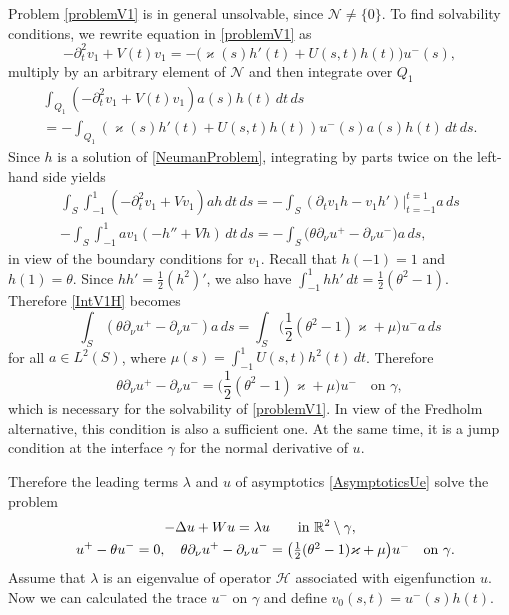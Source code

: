 \documentclass[reqno]{amsart}
\theoremstyle{plain}
\numberwithin{equation}{section}
\renewcommand{\kappa}{\varkappa}
\newcommand{\Real}{\mathbb R}
\newcommand{\cH}{\mathcal{H}}
\newcommand{\pte}{\partial_t}
\begin{document}
Problem \eqref{problemV1} is in general unsolvable, since $\mathcal{N}\neq\{0\}$.  To find solvabi\-li\-ty conditions, we rewrite  equation in \eqref{problemV1} as
\begin{equation}\label{eqnV1Expand}
  -\pte^2 v_1+V(t)v_1=-\big(\kappa(s)h'(t)+U(s,t)h(t)\big)u^-(s),
\end{equation}
multiply  by an arbitrary element of  $\mathcal{N}$  and then integrate over $Q_1$
\begin{multline}\label{IntV1H}
\int_{Q_1}\left(-\pte^2 v_1+V(t)v_1\right)a(s)h(t)\,dt\,ds
\\
=
-\int_{Q_1}(\kappa(s)h'(t)+U(s,t)h(t))u^-(s)a(s)h(t)\, dt\,ds.
\end{multline}
Since $h$ is a solution of \eqref{NeumanProblem}, integrating by parts twice on the left-hand side yields
\begin{multline*}
\int_{S} \int_{-1}^1\left(-\pte^2 v_1+Vv_1\right)a h\,dt \,ds
=-\int_{S}( \partial_tv_1 h-v_1 h')\big|_{t=-1}^{t=1}a\,ds\\-
\int_{S} \int_{-1}^1 a v_1\left(-h''+Vh\right)\,dt\,ds
=-\int_{S}\big(\theta\partial_\nu u^+-\partial_\nu u^-\big) a\,ds,
\end{multline*}
in view of the boundary conditions for $v_1$.
Recall that $h(-1)=1$ and $h(1)=\theta$.
Since $hh'=\frac12 (h^2)'$, we also have $\int_{-1}^1hh'\,d t=\textstyle\frac{1}{2 }(\theta^2-1)$.
Therefore \eqref{IntV1H} becomes
\begin{equation*}
\int_{S}\left(\theta\partial_\nu u^+-\partial_\nu u^-\right)a\,ds
=\int_{S}\big(\textstyle\frac{1}{2}(\theta^2-1)\kappa+\mu \big)u^-a\,ds
\end{equation*}
for all  $a\in L^2(S)$, where $\mu(s)=\int_{-1}^1 U(s,t)h^2(t)\, dt$.
Therefore
\begin{equation*}
  \theta\partial_\nu u^+-\partial_\nu u^-
=\big(\textstyle\frac{1}{2}(\theta^2-1)\kappa+\mu \big) u^-\quad\text {on }\gamma,
\end{equation*}
which is necessary for the solvability of \eqref{problemV1}.
In view of the Fredholm alternative, this condition is also a sufficient one. At the same time, it is a jump condition at the interface $\gamma$ for the normal derivative of $u$.

Therefore the leading terms $\lambda$ and $u$ of asymptotics \eqref{AsymptoticsUe} solve the problem
\begin{gather}\label{LimitProblemEq}
-\Delta u+Wu=\lambda u \qquad \hbox{in  } \Real^2\setminus \gamma,
\\ \label{RConds}
 \phantom{-}u^+-\theta u^-=0,  \quad
\theta\partial_\nu u^+-\partial_\nu u^-
=\big(\textstyle\frac{1}{2}(\theta^2-1)\kappa+\mu \big) u^- \quad \hbox{on } \gamma.
\end{gather}
Assume that $\lambda$ is an eigenvalue of operator $\cH$ associated with eigenfunction $u$. Now we can calculated the trace $u^-$ on $\gamma$ and  define $v_0(s,t)=u^-(s)h(t)$.
\end{document}

